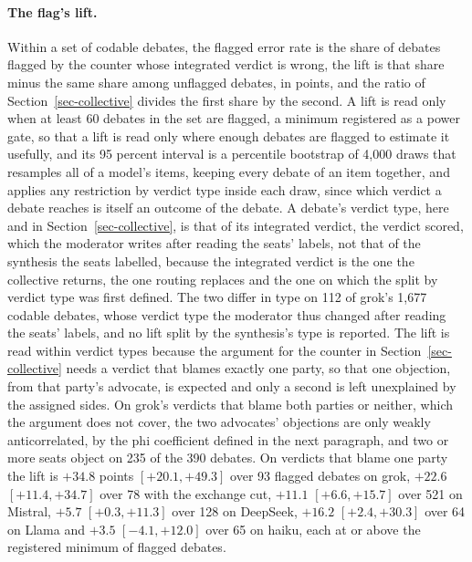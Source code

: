 \paragraph{The flag's lift.}
Within a set of codable debates, the flagged error rate is the share of
debates flagged by the counter whose integrated verdict is wrong, the lift is
that share minus the same share among unflagged debates, in points, and the
ratio of Section~\ref{sec-collective} divides the first share by the second.
A lift is read only when at least 60 debates in the set are flagged, a
minimum registered as a power gate, so that a lift is read only where enough
debates are flagged to estimate it usefully, and its 95 percent interval is a
percentile bootstrap of
4,000 draws that resamples all of a model's items, keeping every debate of an
item together, and applies any restriction by verdict type inside each draw,
since which verdict a debate reaches is itself an outcome of the debate.
A debate's verdict type, here and in Section~\ref{sec-collective}, is that of
its integrated verdict, the verdict scored, which the moderator writes after
reading the seats' labels, not that of the synthesis the seats labelled,
because the integrated verdict is the one the collective returns, the one
routing replaces and the one on which the split by verdict type was first
defined. The two differ in type on 112 of grok's 1,677 codable debates, whose
verdict type the moderator thus changed after reading the seats' labels, and
no lift split by the synthesis's type is reported.
The lift is read within verdict types because the argument for the counter in
Section~\ref{sec-collective} needs a verdict that blames exactly one party, so
that one objection, from that party's advocate, is expected and only a second
is left unexplained by the assigned sides. On grok's verdicts that blame both
parties or neither, which the argument does not cover, the two advocates'
objections are only weakly anticorrelated, by the phi coefficient defined in
the next paragraph, and two or more seats object on
235 of the 390 debates.
On verdicts that blame one party the lift is $+34.8$ points $[+20.1, +49.3]$
over 93 flagged debates on grok, $+22.6$ $[+11.4, +34.7]$ over 78 with the
exchange cut, $+11.1$ $[+6.6, +15.7]$ over 521 on Mistral, $+5.7$
$[+0.3, +11.3]$ over 128 on DeepSeek, $+16.2$ $[+2.4, +30.3]$ over 64 on
Llama and $+3.5$ $[-4.1, +12.0]$ over 65 on haiku, each at or above the
registered minimum of flagged debates.

